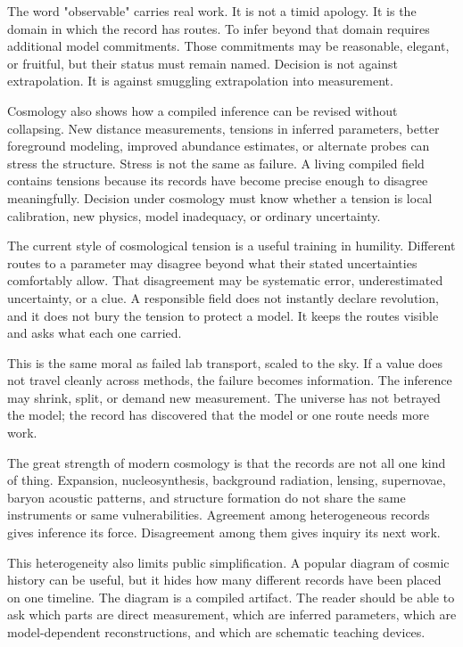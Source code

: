 The word "observable" carries real work. It is not a timid apology. It is the
domain in which the record has routes. To infer beyond that domain requires
additional model commitments. Those commitments may be reasonable, elegant, or
fruitful, but their status must remain named. Decision is not against
extrapolation. It is against smuggling extrapolation into measurement.

Cosmology also shows how a compiled inference can be revised without
collapsing. New distance measurements, tensions in inferred parameters, better
foreground modeling, improved abundance estimates, or alternate probes can
stress the structure. Stress is not the same as failure. A living compiled
field contains tensions because its records have become precise enough to
disagree meaningfully. Decision under cosmology must know whether a tension
is local calibration, new physics, model inadequacy, or ordinary uncertainty.

The current style of cosmological tension is a useful training in humility.
Different routes to a parameter may disagree beyond what their stated
uncertainties comfortably allow. That disagreement may be systematic error,
underestimated uncertainty, or a clue. A responsible field does not instantly
declare revolution, and it does not bury the tension to protect a model. It
keeps the routes visible and asks what each one carried.

This is the same moral as failed lab transport, scaled to the sky. If a value
does not travel cleanly across methods, the failure becomes information. The
inference may shrink, split, or demand new measurement. The universe has not
betrayed the model; the record has discovered that the model or one route
needs more work.

The great strength of modern cosmology is that the records are not all one
kind of thing. Expansion, nucleosynthesis, background radiation, lensing,
supernovae, baryon acoustic patterns, and structure formation do not share the
same instruments or same vulnerabilities. Agreement among heterogeneous
records gives inference its force. Disagreement among them gives inquiry its
next work.

This heterogeneity also limits public simplification. A popular diagram of
cosmic history can be useful, but it hides how many different records have
been placed on one timeline. The diagram is a compiled artifact. The reader
should be able to ask which parts are direct measurement, which are inferred
parameters, which are model-dependent reconstructions, and which are
schematic teaching devices.

